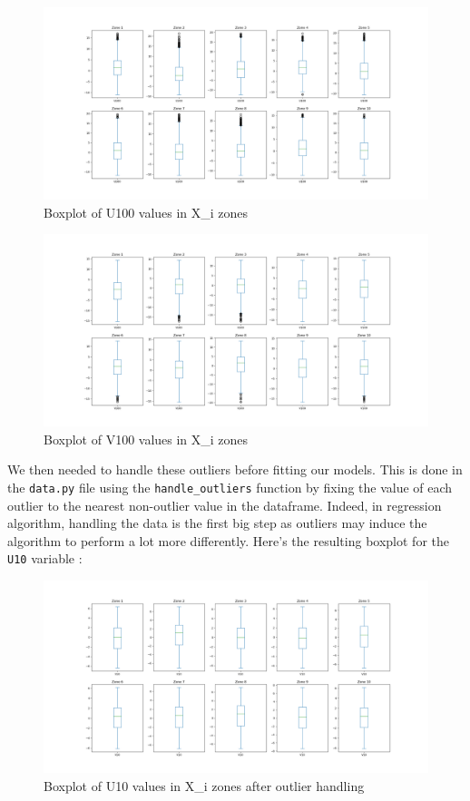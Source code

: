 \begin{figure}[H]
    \centering
    \includegraphics[width=.7\textwidth]{figs/boxplots_X_u100.png}
    \caption{Boxplot of U100 values in X\_i zones}
    \label{fig:boxplot_X_u100}
\end{figure}

\begin{figure}[H]
    \centering
    \includegraphics[width=.7\textwidth]{figs/boxplots_X_v100.png}
    \caption{Boxplot of V100 values in X\_i zones}
    \label{fig:boxplot_X_v100}
\end{figure}

We then needed to handle these outliers before fitting our models. This is done in the \verb|data.py| file using the \verb|handle_outliers| function by fixing the value of each outlier to the nearest non-outlier value in the dataframe. Indeed, in regression algorithm, handling the data is the first big step as outliers may induce the algorithm to perform a lot more differently. Here's the resulting boxplot for the \verb|U10| variable :

\begin{figure}[H]
    \centering
    \includegraphics[width=.7\textwidth]{figs/boxplots_X_v10_handled.png}
    \caption{Boxplot of U10 values in X\_i zones after outlier handling}
    \label{fig:v10_handled}
\end{figure}